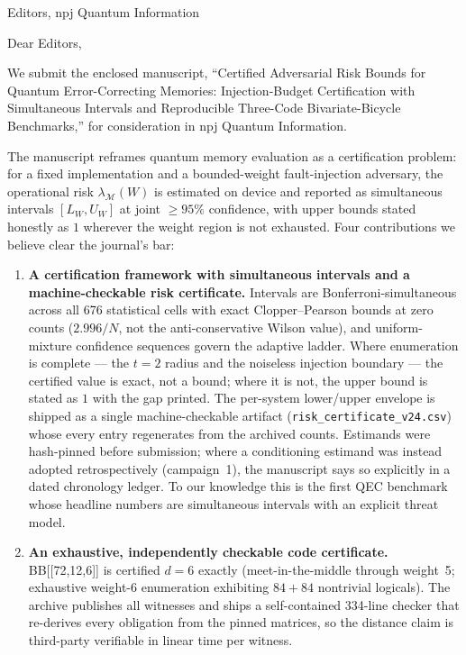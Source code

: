\documentclass[11pt]{letter}
\begin{document}
\begin{letter}{Editors, npj Quantum Information}
\opening{Dear Editors,}

We submit the enclosed manuscript, ``Certified Adversarial Risk Bounds for
Quantum Error-Correcting Memories: Injection-Budget Certification with
Simultaneous Intervals and Reproducible Three-Code Bivariate-Bicycle
Benchmarks,'' for consideration in npj Quantum Information.

The manuscript reframes quantum memory evaluation as a certification problem:
for a fixed implementation and a bounded-weight fault-injection adversary, the
operational risk $\lambda_{\mathcal{M}}(W)$ is estimated on device and reported
as simultaneous intervals $[L_W,U_W]$ at joint $\ge 95\%$ confidence, with
upper bounds stated honestly as $1$ wherever the weight region is not
exhausted. Four contributions we believe clear the journal's bar:
\begin{enumerate}[leftmargin=1.5em,itemsep=4pt]
\item \textbf{A certification framework with simultaneous intervals and a
   machine-checkable risk certificate.} Intervals are
   Bonferroni-simultaneous across all 676 statistical cells with exact
   Clopper--Pearson bounds at zero counts ($2.996/N$, not the
   anti-conservative Wilson value), and uniform-mixture confidence sequences
   govern the adaptive ladder. Where enumeration is complete --- the $t=2$
   radius and the noiseless injection boundary --- the certified value is
   exact, not a bound; where it is not, the upper bound is stated as $1$
   with the gap printed. The per-system lower/upper envelope is shipped as a
   single machine-checkable artifact (\texttt{risk\_certificate\_v24.csv})
   whose every entry regenerates from the archived counts. Estimands were
   hash-pinned before submission; where a conditioning estimand was instead
   adopted retrospectively (campaign~1), the manuscript says so explicitly
   in a dated chronology ledger. To our knowledge this is the first
   QEC benchmark whose headline numbers are simultaneous intervals with an
   explicit threat model.
\item \textbf{An exhaustive, independently checkable code certificate.}
   BB[[72,12,6]] is certified $d=6$ exactly (meet-in-the-middle through
   weight~5; exhaustive weight-6 enumeration exhibiting $84+84$ nontrivial
   logicals). The archive publishes all witnesses and ships a self-contained
   334-line checker that re-derives every obligation from the pinned matrices,
   so the distance claim is third-party verifiable in linear time per witness.

\end{enumerate}
\end{letter}
\end{document}

